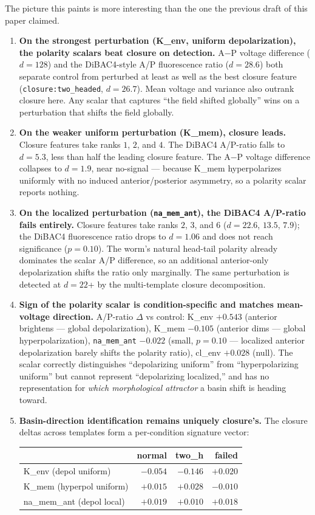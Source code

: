 \documentclass[11pt,a4paper]{article}
\begin{document}
The picture this paints is more interesting than the one the previous draft of this paper claimed.

\begin{enumerate}\itemsep0pt
\item \textbf{On the strongest perturbation (K\_env, uniform depolarization), the polarity scalars beat closure on detection.} A$-$P voltage difference ($d=128$) and the DiBAC4-style A/P fluorescence ratio ($d=28.6$) both separate control from perturbed at least as well as the best closure feature (\texttt{closure:two\_headed}, $d=26.7$). Mean voltage and variance also outrank closure here. Any scalar that captures ``the field shifted globally'' wins on a perturbation that shifts the field globally.
\item \textbf{On the weaker uniform perturbation (K\_mem), closure leads.} Closure features take ranks $1$, $2$, and $4$. The DiBAC4 A/P-ratio falls to $d=5.3$, less than half the leading closure feature. The A$-$P voltage difference collapses to $d=1.9$, near no-signal --- because K\_mem hyperpolarizes uniformly with no induced anterior/posterior asymmetry, so a polarity scalar reports nothing.
\item \textbf{On the localized perturbation (\texttt{na\_mem\_ant}), the DiBAC4 A/P-ratio fails entirely.} Closure features take ranks $2$, $3$, and $6$ ($d=22.6$, $13.5$, $7.9$); the DiBAC4 fluorescence ratio drops to $d=1.06$ and does not reach significance ($p=0.10$). The worm's natural head-tail polarity already dominates the scalar A/P difference, so an additional anterior-only depolarization shifts the ratio only marginally. The same perturbation is detected at $d=22$+ by the multi-template closure decomposition.
\item \textbf{Sign of the polarity scalar is condition-specific and matches mean-voltage direction.} A/P-ratio $\Delta$ vs control: K\_env $+0.543$ (anterior brightens --- global depolarization), K\_mem $-0.105$ (anterior dims --- global hyperpolarization), \texttt{na\_mem\_ant} $-0.022$ (small, $p=0.10$ --- localized anterior depolarization barely shifts the polarity ratio), cl\_env $+0.028$ (null). The scalar correctly distinguishes ``depolarizing uniform'' from ``hyperpolarizing uniform'' but cannot represent ``depolarizing localized,'' and has no representation for \emph{which morphological attractor} a basin shift is heading toward.
\item \textbf{Basin-direction identification remains uniquely closure's.} The closure deltas across templates form a per-condition signature vector:
\begin{center}
\begin{tabular}{lrrr}\toprule
                                & normal   & two\_h   & failed \\
\midrule
K\_env (depol uniform)          & $-0.054$ & $-0.146$ & $+0.020$ \\
K\_mem (hyperpol uniform)       & $+0.015$ & $+0.028$ & $-0.010$ \\
na\_mem\_ant (depol local)      & $+0.019$ & $+0.010$ & $+0.018$ \\
\bottomrule\end{tabular}
\end{center}


\end{enumerate}
\end{document}
